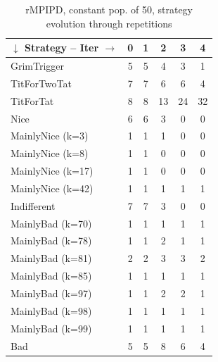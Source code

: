 \documentclass[journal,a4paper,10pt,twoside]{IEEEtran} %
\begin{document}
\begin{table}[ht]
	\caption{rMPIPD, constant pop. of 50, strategy evolution through repetitions}
	\label{tab:ripdmp-const}
	\centering
    \begin{tabular}{l|ccccc} \toprule
    	$\downarrow$ Strategy -- Iter $\rightarrow$  & 0 & 1 & 2  & 3  & 4  \\ \midrule
    	GrimTrigger       & 5 & 5 & 4  & 3  & 1  \\
    	TitForTwoTat      & 7 & 7 & 6  & 6  & 4  \\
    	TitForTat         & 8 & 8 & 13 & 24 & 32 \\
    	Nice              & 6 & 6 & 3  & 0  & 0  \\
    	MainlyNice (k=3)  & 1 & 1 & 1  & 0  & 0  \\
    	MainlyNice (k=8)  & 1 & 1 & 0  & 0  & 0  \\
    	MainlyNice (k=17) & 1 & 1 & 0  & 0  & 0  \\
    	MainlyNice (k=42) & 1 & 1 & 1  & 1  & 1  \\
    	Indifferent       & 7 & 7 & 3  & 0  & 0  \\
    	MainlyBad (k=70)  & 1 & 1 & 1  & 1  & 1  \\
    	MainlyBad (k=78)  & 1 & 1 & 2  & 1  & 1  \\
    	MainlyBad (k=81)  & 2 & 2 & 3  & 3  & 2  \\
    	MainlyBad (k=85)  & 1 & 1 & 1  & 1  & 1  \\
    	MainlyBad (k=97)  & 1 & 1 & 2  & 2  & 1  \\
    	MainlyBad (k=98)  & 1 & 1 & 1  & 1  & 1  \\
    	MainlyBad (k=99)  & 1 & 1 & 1  & 1  & 1  \\
    	Bad               & 5 & 5 & 8  & 6  & 4  \\ \bottomrule
    \end{tabular}
\end{table}
\end{document}
